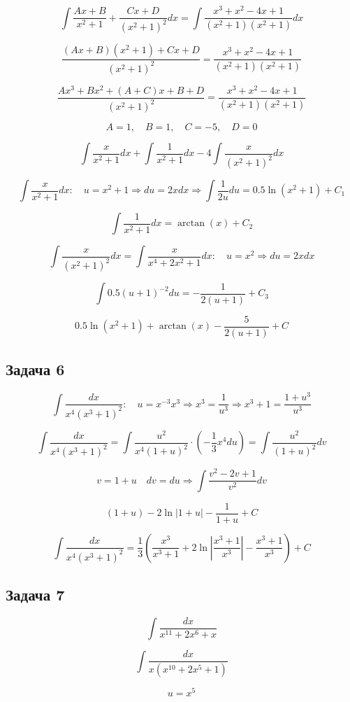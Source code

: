 \documentclass[a4paper,12pt]{article}
\begin{document}
\[
\int \frac{Ax+B}{x^2+1}+\frac{Cx+D}{(x^2+1)^2}dx = \int \frac{x^3+x^2-4x+1}{(x^2+1)(x^2+1)}dx
\]

\[
\frac{(Ax+B)(x^2+1)+Cx+D}{(x^2+1)^2} = \frac{x^3+x^2-4x+1}{(x^2+1)(x^2+1)}
\]

\[
\frac{Ax^3+Bx^2+(A+C)x+B+D}{(x^2+1)^2} = \frac{x^3+x^2-4x+1}{(x^2+1)(x^2+1)}
\]

\[
A = 1, \quad B = 1, \quad C = -5, \quad D = 0
\]

\[
\int \frac{x}{x^2+1}dx + \int \frac{1}{x^2+1}dx-4 \int\frac{x}{(x^2+1)^2}dx
\]


\[
\int \frac{x}{x^2+1}dx: \quad u = x^2+1 \Rightarrow du = 2xdx \Longrightarrow \int \frac{1}{2u}du = 0.5\ln(x^2+1)+C_1
\]

\[
\int \frac{1}{x^2+1}dx = \arctan(x)+C_2
\]

\[
\int\frac{x}{(x^2+1)^2}dx = \int\frac{x}{x^4+2x^2+1}dx: \quad u = x^2 \Rightarrow  du = 2xdx
\]  

\[
\int 0.5(u+1)^{-2}du = -\frac{1}{2(u+1)} + C_3
\]

\[
0.5\ln(x^2+1) + \arctan(x)-\frac{5}{2(u+1)} + C
\]

\subsection{Задача 6}

\[
\int \frac{dx}{x^4(x^3+1)^2}: \quad u = x^{-3} x^3  \Rightarrow x^3 = \frac{1}{u^3} \Rightarrow x^3+1 = \frac{1+u^3}{u^3}
\]

\[
\int \frac{dx}{x^4(x^3+1)^2} = \int \frac{u^2}{x^4(1+u)^2}\cdot (-\frac{1}{3}x^4du) = \int \frac{u^2}{(1+u)^2}dv
\]

\[
v = 1+u \quad dv = du \Rightarrow \int \frac{v^2-2v+1}{v^2}dv
\]

\[
    (1+u) - 2\ln|1+u| - \frac{1}{1+u} + C
\]

\[
    \int \frac{dx}{x^4 (x^3+1)^2} = \frac{1}{3}\left(\frac{x^3}{x^3+1} + 2\ln\left|\frac{x^3+1}{x^3}\right| - \frac{x^3+1}{x^3}\right) + C
\]


\subsection{Задача 7}

\[
\int \frac{dx}{x^{11} + 2x^6 + x}
\]

\[
    \int \frac{dx}{x(x^{10} + 2x^5 + 1)}
\]

\[
u = x^5
\]
\end{document}

